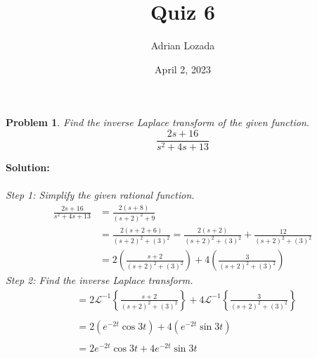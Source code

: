 \documentclass{article}
\title{Quiz 6}
\author{Adrian Lozada}
\date{April 2, 2023}
\newtheorem{problem}{Problem}
\begin{document}
    \maketitle
    \newpage

    \begin{problem}
        Find the inverse Laplace transform of the given function.
        \[            \frac{2s + 16}{s^{2} + 4s + 13}        \]
    \end{problem}
    \textbf{Solution:} \\ \\ 
    \textit{Step 1: Simplify the given rational function.} \\
     \begin{align*}
        \frac{2s + 16}{s^{2} + 4s + 13} &= \frac{2(s + 8)}{(s + 2)^{2} + 9} \\
        &= \frac{2(s + 2 + 6)}{(s + 2)^{2} + (3)^{2}} = \frac{2(s + 2)}{(s + 2)^{2} + (3)^{2}} + \frac{12}{(s + 2)^{2} + (3)^{2}} \\
        &= 2\left( \frac{s + 2}{(s + 2)^{2} + (3)^{2}}\right) + 4\left( \frac{3}{(s + 2)^{2} + (3)^{2}}\right)
     \end{align*}
    \textit{Step 2: Find the inverse Laplace transform.} \\
    \begin{align*}
       &= 2\mathcal{L}^{-1} \left\{ \frac{s + 2}{(s + 2)^{2} + (3)^{2}}\right\} + 4\mathcal{L}^{-1} \left\{ \frac{3}{(s + 2)^{2} + (3)^{2}}\right\} \\ \\
       &= 2(e^{-2t}\cos{3t}) + 4(e^{-2t}\sin{3t}) \\ \\
       &= 2e^{-2t}\cos{3t} + 4e^{-2t}\sin{3t}
    \end{align*}
    \newpage
\end{document}
